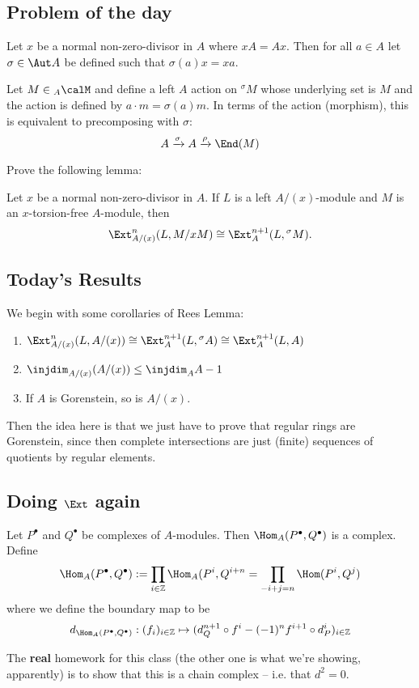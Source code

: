 \documentclass[12pt]{article}
\newcommand*{\Z}{
\mathbb{Z}
}
\begin{document}
\subsection{Problem of the day}
\begin{prob}
	Let $x$ be a normal non-zero-divisor in $A$ where $xA=Ax$. Then for all $a\in A$ let $\sigma\in\Aut A$ be defined such that
	$\sigma(a) x= xa$.

	Let $M\in {_A\calM}$ and define a left $A$ action on ${^\sigma M}$ whose underlying set is $M$ and the action is defined by $a\cdot m=\sigma(a)m$. In terms of the action (morphism), this is 
	equivalent to precomposing with $\sigma:$ 
	\[A\xrightarrow{\sigma} A\xrightarrow{\rho}\End(M)\]

	Prove the following lemma:
	\begin{lem}
		Let $x$ be a normal non-zero-divisor in $A$. If $L$ is a left $A/(x)$-module and $M$ is an $x$-torsion-free $A$-module, then
		\[\Ext_{A/(x)}^n(L,M/xM)\cong \Ext_A^{n+1}(L,{^\sigma M}).\]
	\end{lem}
\end{prob}

\subsection{Today's Results}
We begin with some corollaries of Rees Lemma:
\begin{cor}
	\begin{enumerate}
		\item $\Ext_{A/(x)}^n(L, A/(x))\cong \Ext_A^{n+1}(L,{^\sigma A})\cong\Ext_A^{n+1}(L,A)$
		\item $\injdim_{A/(x)}(A/(x))\le \injdim_AA-1$
		\item If $A$ is Gorenstein, so is $A/(x)$.
	\end{enumerate}
\end{cor}
\begin{rmk}
	Then the idea here is that we just have to prove that regular rings are Gorenstein, since then complete intersections
	are just (finite) sequences of quotients by regular elements.
\end{rmk}
\subsection{Doing $\Ext$ again}
Let $P^\bullet$ and $Q^\bullet$ be complexes of $A$-modules. Then $\Hom_A(P^\bullet, Q^\bullet)$ is a complex. Define
\[\Hom_A(P^\bullet, Q^\bullet):=\prod_{i\in\Z}\Hom_A(P^i,Q^{i+n}=\prod_{-i+j=n}\Hom(P^i,Q^j)\]
where we define the boundary map to be 
\[d_{\Hom_A(P^\bullet,Q^\bullet)}:(f_i)_{i\in\Z}\mapsto (d_Q^{n+1}\circ f^i - (-1)^nf^{i+1}\circ d_P^i)_{i\in\Z}\]
\begin{prob}
	The \textbf{real} homework for this class (the other one is what we're showing, apparently) is to show that this is a
	chain complex -- i.e. that $d^2=0$.
\end{prob}
\end{document}
